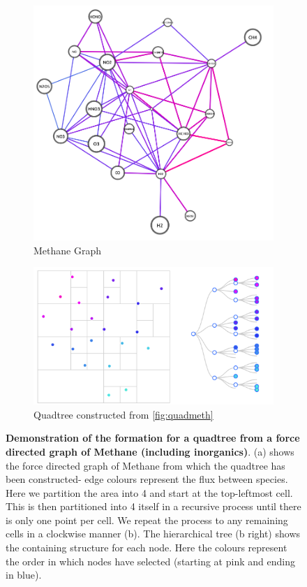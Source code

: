\begin{figure}[H]
 \centering
    \begin{subfigure}[b]{.3\textwidth}
  \centering \includegraphics[width=\textwidth]{figures_c1/layout/methanequad.png}   
  \caption{Methane Graph} 
  \label{fig:quadmeth}
 \end{subfigure}
 \begin{subfigure}[b]{.6\textwidth}
  \centering \includegraphics[width=\textwidth]{figures_c1/layout/quad.png}
 \caption{Quadtree constructed from \autoref{fig:quadmeth}}
\label{fig:quadtree}
\end{subfigure}
\caption{ \textbf{Demonstration of the formation for a quadtree from a force directed graph of Methane (including inorganics)}. (a) shows the force directed graph of Methane from which the quadtree has been constructed- edge colours represent the flux between species. Here we partition the area into 4 and start at the top-leftmost cell. This is then partitioned into 4 itself in a recursive process until there is only one point per cell. We repeat the process to any remaining cells in a clockwise manner (b). The hierarchical tree (b right) shows the containing structure for each node. Here the colours represent the order in which nodes have selected (starting at pink and ending in blue). }
\label{fig:quadgroup}
\end{figure}

